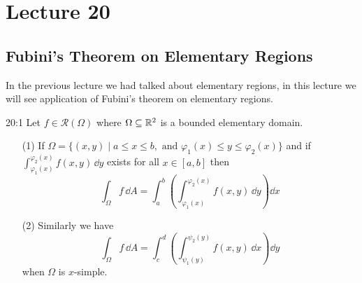 \documentclass[../Analysis-3.tex]{subfiles}
\begin{document}
\chapter*{Lecture 20} %
\setcounter{chapter}{20} %
\setcounter{section}{0}
\setcounter{equation}{0}
\setcounter{figure}{0}


\section{Fubini's Theorem on Elementary Regions}

In the previous lecture we had talked about elementary regions, in this lecture we will see application of Fubini's theorem on elementary regions.

\begin{Thm}{}{20:1}
  Let $f \in \mathscr{R}(\Omega)$ where $\Omega \subseteq \mathbb{R}^2$ is a bounded elementary domain.
  \begin{enumerate}
    \item[(1)] If $\Omega = \{ (x,y) \mid a \leq x \leq b, \mbox{ and } \varphi_1(x) \leq y \leq \varphi_2(x) \}$ and if $\displaystyle{\int_{\varphi_1(x)}^{\varphi_2(x)}f(x,y) \, \dd
          y}$ exists for all $x \in [a,b]$ then
      \[
        \int_{\Omega} f \, \dd A = \int_a^b \left( \int_{\varphi_1(x)}^{\varphi_2(x)} f(x,y) \, \dd y\right) \dd x
      \]

    \item[(2)] Similarly we have
      \[
        \int_{\Omega} f \, \dd A = \int_c^d \left( \int_{\psi_1(y)}^{\psi_2(y)} f(x,y) \, \dd x\right) \dd y
      \]
      when $\Omega$ is $x$-simple.
  \end{enumerate}
\end{Thm}
\end{document}
